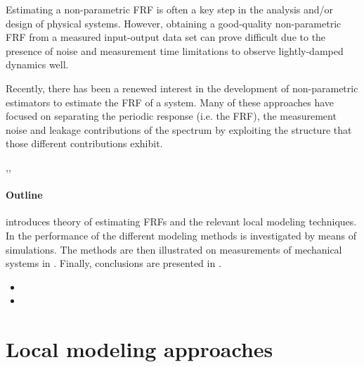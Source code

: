 Estimating a non-parametric \gls{FRF} is often a key step in the analysis and/or design of physical systems.
However, obtaining a good-quality non-parametric \gls{FRF} from a measured input-output data set can prove difficult due to the presence of noise and measurement time limitations to observe lightly-damped dynamics well.

Recently, there has been a renewed interest in the development of non-parametric estimators to estimate the \gls{FRF} of a system.
Many of these approaches have focused on separating the periodic response (i.e. the \gls{FRF}), the measurement noise and leakage contributions of the spectrum by exploiting the structure that those different contributions exhibit.


\citep{Pintelon2010LPM1},\citep{Pintelon2010LPM2},\citep{McKelvey2012LRM}



\paragraph*{Outline}
 introduces theory of estimating \glspl{FRF} and the relevant local modeling techniques.
In  the performance of the different modeling methods is investigated by means of simulations.
The methods are then illustrated on measurements of mechanical systems in .
Finally, conclusions are presented in .


\begin{itemize}
    \item {}
    \item {}
\end{itemize}

\section{Local modeling approaches}
\label{sec:theory}


